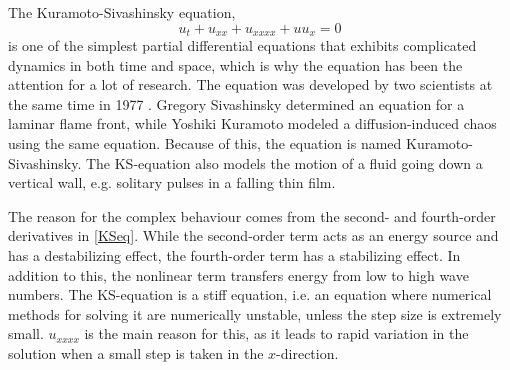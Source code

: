 The Kuramoto-Sivashinsky equation,
\begin{equation}
\label{KSeq}
u_t + u_{xx} + u_{xxxx} + uu_{x} = 0 
\end{equation}
is one of the simplest partial differential equations that exhibits complicated dynamics in both time and space, which is why the equation has been the attention for a lot of research. The equation was developed by two scientists at the same time in 1977 \cite{development}. Gregory Sivashinsky determined an equation for a laminar flame front, while Yoshiki Kuramoto modeled a diffusion-induced chaos using the same equation. Because of this, the equation is named Kuramoto-Sivashinsky. The KS-equation also models the motion of a fluid going down a vertical wall, e.g. solitary pulses in a falling thin film. \cite{trivia}

The reason for the complex behaviour comes from the second- and fourth-order derivatives in \eqref{KSeq}. While the second-order term acts as an energy source and has a destabilizing effect, the fourth-order term has a stabilizing effect. In addition to this, the nonlinear term transfers energy from low to high wave numbers. \cite{stabil} The KS-equation is a stiff equation, i.e. an equation where numerical methods for solving it are numerically unstable, unless the step size is extremely small. $u_{xxxx}$ is the main reason for this, as it leads to rapid variation in the solution when a small step is taken in the $x$-direction.








